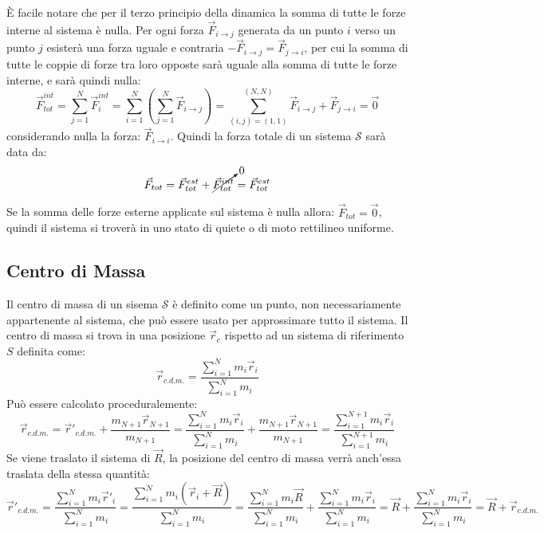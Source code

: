 \documentclass{article}
\numberwithin{equation}{subsection}
\begin{document}
\`{E} facile notare che per il terzo principio della dinamica 
la somma di tutte le forze interne al sistema è nulla. Per ogni 
forza $\vec{F}_{i\to j}$ generata da un punto $i$ verso un punto $j$ 
esisterà una forza uguale e contraria $-\vec{F}_{i\to j}=\vec{F}_{j\to i}$, 
per cui la somma di tutte le coppie di forze tra loro opposte 
sarà uguale alla somma di tutte le forze interne, e sarà quindi nulla:
\begin{equation}
    \vec{F}_{tot}^{int}=\displaystyle\sum_{j=1}^{N}\vec{F}_i^{int}=\sum_{i=1}^{N}\left(\sum_{j=1}^{N}\vec{F}_{i\to j}\right)=\sum_{(i,j)=(1,1)}^{(N,N)}\vec{F}_{i\to j}+\vec{F}_{j\to i}=\vec{0}
\end{equation}
considerando nulla la forza: $\vec{F}_{i\to i}$.
Quindi la forza totale di un sistema $\mathscr{S}$ sarà data da:
\begin{equation}
    \vec{F}_{tot}=\vec{F}^{est}_{tot}+\cancelto{0}{\vec{F}^{int}_{tot}}=\vec{F}^{est}_{tot}
\end{equation}


Se la somma delle forze esterne applicate sul sistema 
è nulla allora: $\vec{F}_{tot}=\vec{0}$, quindi il sistema 
si troverà in uno stato di quiete o di moto rettilineo uniforme. 

\subsection{Centro di Massa}
Il centro di massa di un sisema $\mathscr{S}$ è definito come 
un punto, non necessariamente appartenente al sistema, che può essere usato per approssimare tutto il sistema. 
Il centro di massa si trova in una posizione $\vec{r}_c$ 
rispetto ad un sistema di riferimento $S$ definita come:
\begin{equation}
    \vec{r}_{c.d.m.}=\displaystyle\frac{\sum_{i=1}^{N}m_i\vec{r}_i}{\sum_{i=1}^{N}m_i}
\end{equation}
Può essere calcolato proceduralemente:
\begin{equation*}
    \vec{r}_{c.d.m.}=\displaystyle\vec{r}'_{c.d.m.}+\frac{m_{N+1}\vec{r}_{N+1}}{m_{N+1}}=\frac{\sum_{i=1}^{N}m_i\vec{r}_i}{\sum_{i=1}^{N}m_i}+\frac{m_{N+1}\vec{r}_{N+1}}{m_{N+1}}=\frac{\sum_{i=1}^{N+1}m_i\vec{r}_i}{\sum_{i=1}^{N+1}m_i}
\end{equation*}
Se viene traslato il sistema di $\vec{R}$, la posizione del 
centro di massa verrà anch'essa traslata della stessa quantità:
\begin{equation*}
    \vec{r}'_{c.d.m.}=\displaystyle\frac{\sum_{i=1}^{N}m_i\vec{r}'_i}{\sum_{i=1}^{N}m_i}=\displaystyle\frac{\sum_{i=1}^{N}m_i(\vec{r}_i+\vec{R})}{\sum_{i=1}^{N}m_i}=\displaystyle\frac{\sum_{i=1}^{N}m_i\vec{R}}{\sum_{i=1}^{N}m_i}+\displaystyle\frac{\sum_{i=1}^{N}m_i\vec{r}_i}{\sum_{i=1}^{N}m_i}=\vec{R}+\displaystyle\frac{\sum_{i=1}^{N}m_i\vec{r}_i}{\sum_{i=1}^{N}m_i}=\vec{R}+\vec{r}_{c.d.m.}
\end{equation*}
\end{document}
